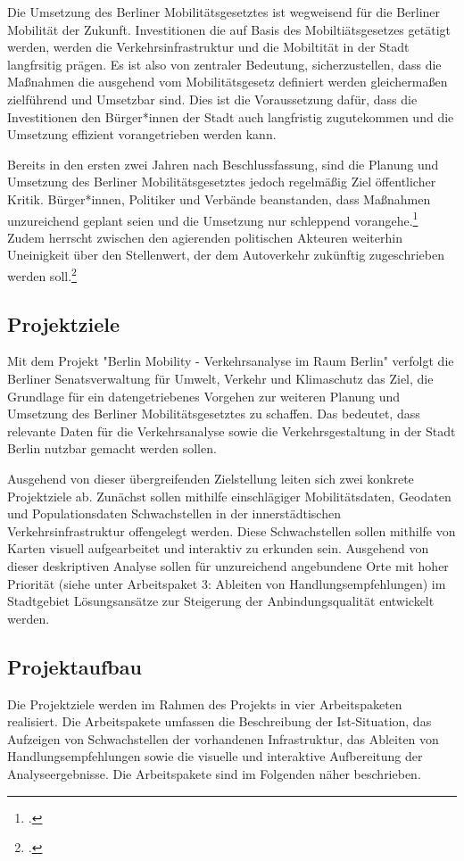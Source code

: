 Die Umsetzung des Berliner Mobilitätsgesetztes ist wegweisend für die Berliner Mobilität der Zukunft. Investitionen die auf Basis des Mobiltiätsgesetzes getätigt werden, werden die Verkehrsinfrastruktur und die Mobiltität in der Stadt langfrsitig prägen. Es ist also von zentraler Bedeutung, sicherzustellen, dass die Maßnahmen die ausgehend vom Mobilitätsgesetz definiert werden gleichermaßen zielführend und Umsetzbar sind. Dies ist die Voraussetzung dafür, dass die Investitionen den Bürger*innen der Stadt auch langfristig zugutekommen und die Umsetzung effizient vorangetrieben werden kann.

Bereits in den ersten zwei Jahren nach Beschlussfassung, sind die Planung und Umsetzung des Berliner Mobilitätsgesetztes jedoch regelmäßig Ziel öffentlicher Kritik. Bürger*innen, Politiker und Verbände beanstanden, dass Maßnahmen unzureichend geplant seien und die Umsetzung nur schleppend vorangehe.\footcite{Tagesspiegel.2019} Zudem herrscht zwischen den agierenden politischen Akteuren weiterhin Uneinigkeit über den Stellenwert, der dem Autoverkehr zukünftig zugeschrieben werden soll.\footcite{Tagesspiegel.2020}

\subsection{Projektziele}
Mit dem Projekt "Berlin Mobility - Verkehrsanalyse im Raum Berlin" verfolgt die Berliner Senatsverwaltung für Umwelt, Verkehr und Klimaschutz das Ziel, die Grundlage für ein datengetriebenes Vorgehen zur weiteren Planung und Umsetzung des Berliner Mobilitätsgesetztes zu schaffen. Das bedeutet, dass relevante Daten für die Verkehrsanalyse sowie die Verkehrsgestaltung in der Stadt Berlin nutzbar gemacht werden sollen.

Ausgehend von dieser übergreifenden Zielstellung leiten sich zwei konkrete Projektziele ab. Zunächst sollen mithilfe einschlägiger Mobilitätsdaten, Geodaten und Populationsdaten Schwachstellen in der innerstädtischen Verkehrsinfrastruktur offengelegt werden. Diese Schwachstellen sollen mithilfe von Karten visuell aufgearbeitet und interaktiv zu erkunden sein. Ausgehend von dieser deskriptiven Analyse sollen für unzureichend angebundene Orte mit hoher Priorität (siehe unter Arbeitspaket 3: Ableiten von Handlungsempfehlungen) im Stadtgebiet Lösungsansätze zur Steigerung der Anbindungsqualität entwickelt werden.

\subsection{Projektaufbau}
Die Projektziele werden im Rahmen des Projekts in vier Arbeitspaketen realisiert. Die Arbeitspakete umfassen die Beschreibung der Ist-Situation, das Aufzeigen von Schwachstellen der vorhandenen Infrastruktur, das Ableiten von Handlungsempfehlungen sowie die visuelle und interaktive Aufbereitung der Analyseergebnisse. Die Arbeitspakete sind im Folgenden näher beschrieben.

